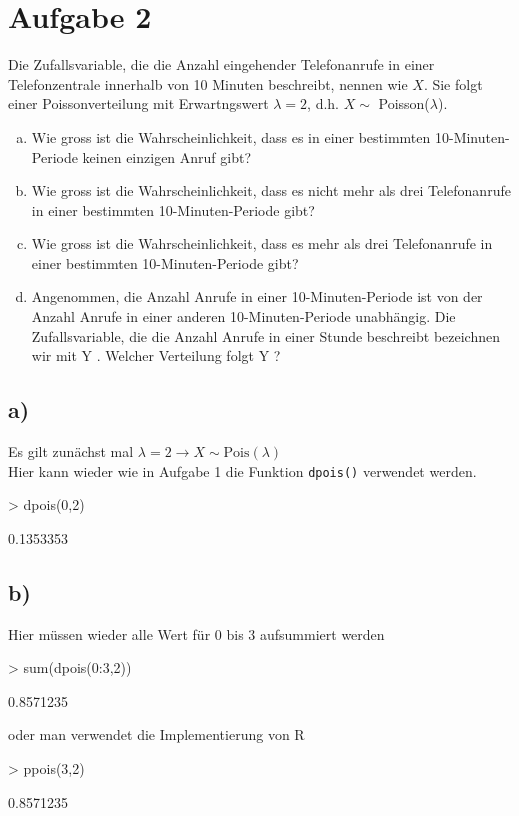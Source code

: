 \section{Aufgabe 2}
Die Zufallsvariable, die die Anzahl eingehender Telefonanrufe in einer 
Telefonzentrale innerhalb von 10 Minuten beschreibt, nennen wie $X$.
Sie folgt einer Poissonverteilung mit Erwartngswert $\lambda = 2$, d.h.
$X \sim$ Poisson($\lambda$).

\begin{enumerate}[(a)]
    \item Wie gross ist die Wahrscheinlichkeit, dass es in einer 
          bestimmten 10-Minuten-Periode keinen einzigen Anruf gibt?
    \item Wie gross ist die Wahrscheinlichkeit, dass es nicht mehr als drei 
          Telefonanrufe in einer bestimmten 10-Minuten-Periode gibt?
    \item Wie gross ist die Wahrscheinlichkeit, dass es mehr als drei 
          Telefonanrufe in einer bestimmten 10-Minuten-Periode gibt?
    \item Angenommen, die Anzahl Anrufe in einer 10-Minuten-Periode ist von 
          der Anzahl Anrufe in einer anderen 10-Minuten-Periode unabhängig. 
          Die Zufallsvariable, die die Anzahl Anrufe in einer Stunde 
          beschreibt bezeichnen wir mit Y . Welcher Verteilung folgt Y ?
\end{enumerate}

\subsection*{a)}
Es gilt zunächst mal $\lambda = 2 \rightarrow X \sim \text{Pois}(\lambda)$\\

\noindent
Hier kann wieder wie in Aufgabe 1 die Funktion \verb!dpois()! verwendet 
werden.
\begin{Schunk}
\begin{Sinput}
> dpois(0,2)
\end{Sinput}
\begin{Soutput}
[1] 0.1353353
\end{Soutput}
\end{Schunk}

\subsection*{b)}
Hier müssen wieder alle Wert für $0$ bis $3$ aufsummiert werden
\begin{Schunk}
\begin{Sinput}
> sum(dpois(0:3,2))
\end{Sinput}
\begin{Soutput}
[1] 0.8571235
\end{Soutput}
\end{Schunk}
oder man verwendet die Implementierung von R 
\begin{Schunk}
\begin{Sinput}
> ppois(3,2)
\end{Sinput}
\begin{Soutput}
[1] 0.8571235
\end{Soutput}
\end{Schunk}

